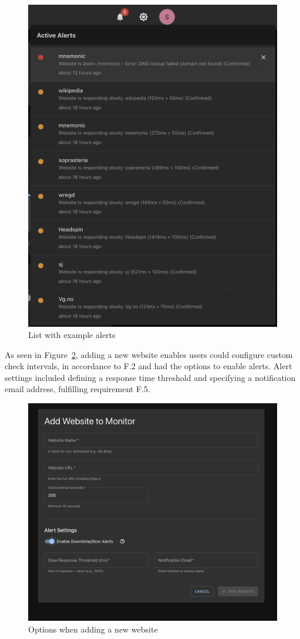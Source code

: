 \begin{figure}
    \centering
    \includegraphics[width=0.65\linewidth]{figures/MVP-dashboard/MVP-only_alertlist.png}
    \caption{List with example alerts}
    \label{fig:alertlist}
\end{figure}

As seen in Figure~\ref{fig:mvpaddwebsite}, adding a new website enables users could configure custom check intervals, in accordance to F.2 and had the options  to enable alerts. Alert settings included defining a response time threshold and specifying a notification email address, fulfilling requirement F.5. 

\begin{figure}
    \centering
    \includegraphics[width=0.6\linewidth]{figures/MVP-dashboard/MVP-addwebsite.png}
    \caption{Options when adding a new website}
    \label{fig:mvpaddwebsite}
\end{figure}



